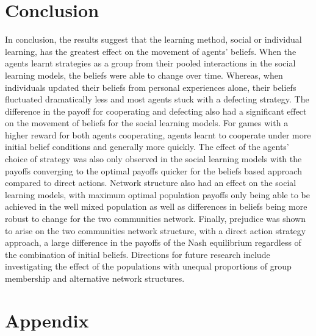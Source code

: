 \documentclass[]{llncs}
\begin{document}
\section{Conclusion}
In conclusion, the results suggest that the learning method, social or individual learning, has the greatest effect on the movement of agents’ beliefs.  When the agents learnt strategies as a group from their pooled interactions in the social learning models, the beliefs were able to change over time. Whereas, when individuals updated their beliefs from personal experiences alone, their beliefs fluctuated dramatically less and most agents stuck with a defecting strategy.  The difference in the payoff for cooperating and defecting also had a significant effect on the movement of beliefs for the social learning models. For games with a higher reward for both agents cooperating, agents learnt to cooperate under more initial belief conditions and generally more quickly. The effect of the agents’ choice of strategy was also only observed in the social learning models with the payoffs converging to the optimal payoffs quicker for the beliefs based approach compared to direct actions. Network structure also had an effect on the social learning models, with maximum optimal population payoffs only being able to be achieved in the well mixed population as well as differences in beliefs being more robust to change for the two communities network. 
Finally, prejudice was shown to arise on the two communities network structure, with a direct action strategy approach, a large difference in the payoffs of the Nash equilibrium regardless of the combination of initial beliefs. Directions for future research include investigating the effect of the populations with unequal proportions of group membership and alternative network structures. 

\section{Appendix}
\end{document}
